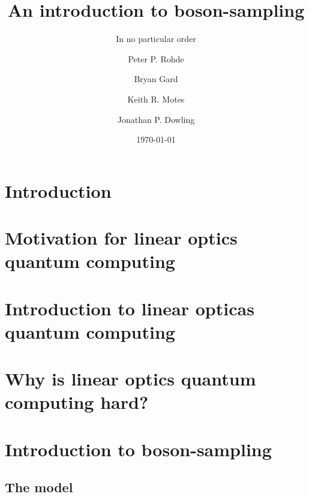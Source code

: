 \documentclass[aps,pra,twocolumn,amsmath,amssymb,nofootinbib,superscriptaddress]{revtex4}
\begin{document}


%
%

\title{An introduction to boson-sampling}

%
%

\author{In no particular order}

\author{Peter P. Rohde}

\author{Bryan Gard}

\author{Keith R. Motes}

\author{Jonathan P. Dowling}

\date{\today}

\frenchspacing

%
%

\begin{abstract}
\end{abstract}

\maketitle

\section{Introduction}

\section{Motivation for linear optics quantum computing}

\section{Introduction to linear opticas quantum computing}

\section{Why is linear optics quantum computing hard?}

\section{Introduction to boson-sampling}

\subsection{The model}
\end{document}
